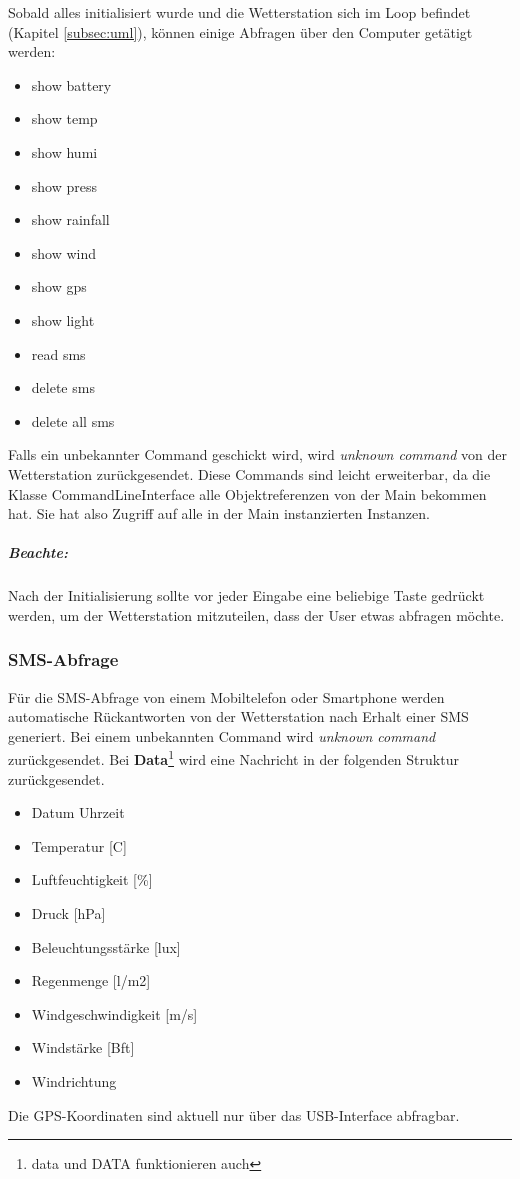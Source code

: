 Sobald alles initialisiert wurde und die Wetterstation sich im Loop befindet (Kapitel \ref{subsec:uml}), können einige Abfragen über den Computer getätigt werden:\\
\begin{itemize}
	\item show battery
	\item show temp
	\item show humi
	\item show press
	\item show rainfall
	\item show wind
	\item show gps
	\item show light
	\item read sms
	\item delete sms
	\item delete all sms
\end{itemize}
Falls ein unbekannter Command geschickt wird, wird \textit{unknown command} von der Wetterstation zurückgesendet. Diese Commands sind leicht erweiterbar, da die Klasse CommandLineInterface alle Objektreferenzen von der Main bekommen hat. Sie hat also Zugriff auf alle in der Main instanzierten Instanzen.\\

\subparagraph{Beachte:}
Nach der Initialisierung sollte vor jeder Eingabe eine beliebige Taste gedrückt werden, um der Wetterstation mitzuteilen, dass der User etwas abfragen möchte.\\

\subsubsection{SMS-Abfrage}
\label{subsubsec:smsAbrage}
Für die SMS-Abfrage von einem Mobiltelefon oder Smartphone werden automatische Rückantworten von der Wetterstation nach Erhalt einer SMS generiert. Bei einem unbekannten Command wird \textit{unknown command} zurückgesendet. Bei \textbf{Data}\footnote{data und DATA funktionieren auch} wird eine Nachricht in der folgenden Struktur zurückgesendet.
\begin{itemize}
	\item[ ] Datum Uhrzeit
	\item[ ] Temperatur [C]
	\item[ ] Luftfeuchtigkeit [\%]
	\item[ ] Druck [hPa]
	\item[ ] Beleuchtungsstärke [lux]
	\item[ ] Regenmenge [l/m2]
	\item[ ] Windgeschwindigkeit [m/s]
	\item[ ] Windstärke [Bft]
	\item[ ] Windrichtung
\end{itemize}
Die GPS-Koordinaten sind aktuell nur über das USB-Interface abfragbar. \\
